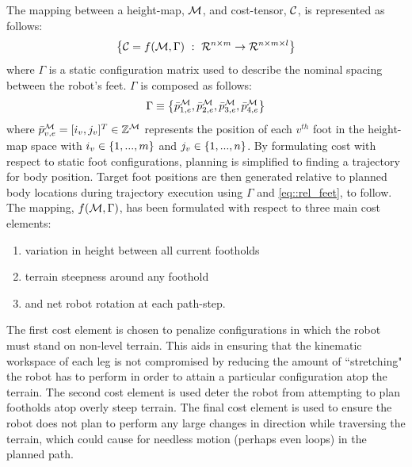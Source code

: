 			The mapping between a height-map,  ${\cal M}$, and cost-tensor, ${\cal C}$, is represented as follows:
				\begin{equation}
					\left\{ {\cal C} = f({\cal M},\Gamma)\text{ }:\text{ }{\cal R}^{n\times m} \rightarrow {\cal R}^{n\times m \times l} \right\}
					\label{eq::cost_mapping}
				\end{equation}
			where $\Gamma$ is a static configuration matrix used to describe the nominal spacing between the robot's feet. $\Gamma$ is composed as follows:
				\begin{equation*}
					\Gamma \equiv \left\{\bar{p}_{1,e}^{{\cal M}},\bar{p}_{2,e}^{{\cal M}},\bar{p}_{3,e}^{{\cal M}},\bar{p}_{4,e}^{{\cal M}}\right\}
					\label{eq::cost_gamma}
				\end{equation*}
			where $\bar{p}_{v,e}^{{\cal M}}=[i_{v},j_{v}]^{T}\in{\Bbb Z}^{{\cal M}}$ represents the position of each $v^{th}$ foot in the height-map space with $i_{v}\in \left\{1,...,m\right\}$ and $j_{v}\in\left\{1,...,n\right\}$. By formulating cost with respect to static foot configurations, planning is simplified to finding a trajectory for body position. Target foot positions are then generated relative to planned body locations during trajectory execution using $\Gamma$ and \ref{eq::rel_feet}, to follow. The mapping, $f({\cal M},\Gamma)$, has been formulated with respect to three main cost elements:
				\begin{enumerate}
					\item variation in height between all current footholds
					\item terrain steepness around any foothold
					\item and net robot rotation at each path-step.
				\end{enumerate}
			The first cost element is chosen to penalize configurations in which the robot must stand on non-level terrain. This aids in ensuring that the kinematic workspace of each leg is not compromised by reducing the amount of ``stretching" the robot has to perform in order to attain a particular configuration atop the terrain. The second cost element is used deter the robot from attempting to plan footholds atop overly steep terrain. The final cost element is used to ensure the robot does not plan to perform any large changes in direction while traversing the terrain, which could cause for needless motion (perhaps even loops) in the planned path. 

